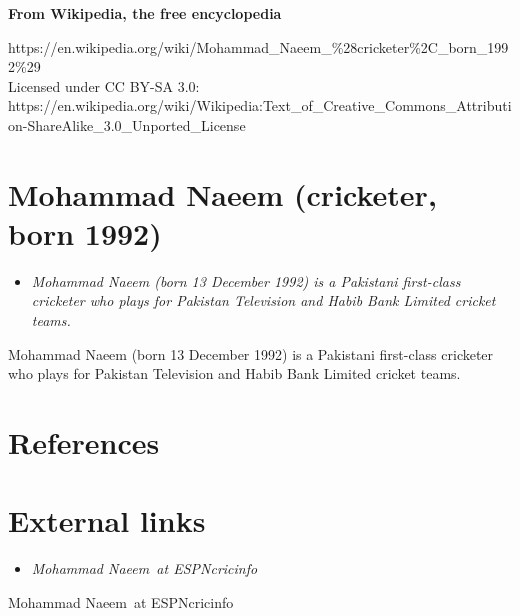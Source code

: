 \textbf{From Wikipedia, the free encyclopedia}

https://en.wikipedia.org/wiki/Mohammad\_Naeem\_\%28cricketer\%2C\_born\_1992\%29\\
Licensed under CC BY-SA 3.0:\\
https://en.wikipedia.org/wiki/Wikipedia:Text\_of\_Creative\_Commons\_Attribution-ShareAlike\_3.0\_Unported\_License

\section{Mohammad Naeem (cricketer, born
1992)}\label{mohammad-naeem-cricketer-born-1992}

\begin{itemize}
\item
  \emph{Mohammad Naeem (born 13 December 1992) is a Pakistani
  first-class cricketer who plays for Pakistan Television and Habib Bank
  Limited cricket teams.}
\end{itemize}

Mohammad Naeem (born 13 December 1992) is a Pakistani first-class
cricketer who plays for Pakistan Television and Habib Bank Limited
cricket teams.

\section{References}\label{references}

\section{External links}\label{external-links}

\begin{itemize}
\item
  \emph{Mohammad Naeem~at ESPNcricinfo}
\end{itemize}

Mohammad Naeem~at ESPNcricinfo
